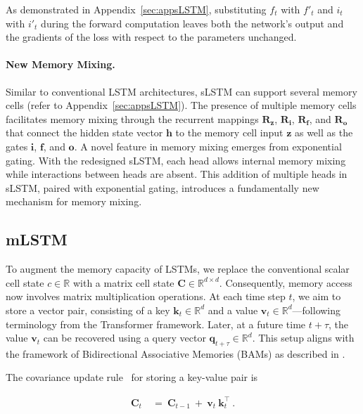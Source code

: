 As demonstrated in Appendix~\ref{sec:appsLSTM}, substituting $f_t$ with $f'_t$ and $i_t$ with $i'_t$ during the forward computation leaves both the network’s output and the gradients of the loss with respect to the parameters unchanged.

\paragraph{New Memory Mixing.} Similar to conventional LSTM architectures, sLSTM can support several memory cells (refer to Appendix~\ref{sec:appsLSTM}). The presence of multiple memory cells facilitates memory mixing through the recurrent mappings $\mathbf{R}_{\mathbf{z}}$, $\mathbf{R}_{\mathbf{i}}$, $\mathbf{R}_{\mathbf{f}}$, and $\mathbf{R}_{\mathbf{o}}$ that connect the hidden state vector $\mathbf{h}$ to the memory cell input $\mathbf{z}$ as well as the gates $\mathbf{i}$, $\mathbf{f}$, and $\mathbf{o}$. A novel feature in memory mixing emerges from exponential gating. With the redesigned sLSTM, each head allows internal memory mixing while interactions between heads are absent. This addition of multiple heads in sLSTM, paired with exponential gating, introduces a fundamentally new mechanism for memory mixing.

\subsection{mLSTM}
\label{sec:mLSTM}

To augment the memory capacity of LSTMs, we replace the conventional scalar cell state $c \in \mathbb{R}$ with a matrix cell state $\mathbf{C} \in \mathbb{R}^{d \times d}$. Consequently, memory access now involves matrix multiplication operations. At each time step $t$, we aim to store a vector pair, consisting of a key $\mathbf{k}_t \in \mathbb{R}^d$ and a value $\mathbf{v}_t \in \mathbb{R}^d$—following terminology from the Transformer framework. Later, at a future time $t + \tau$, the value $\mathbf{v}_t$ can be recovered using a query vector $\mathbf{q}_{t+\tau} \in \mathbb{R}^d$. This setup aligns with the framework of Bidirectional Associative Memories (BAMs) as described in \citep{Kohonen:72,Anderson:72,Nakano:72,Anderson:77}.

The covariance update rule~\citep{Sejnowski:77,Dayan:91} for storing a key-value pair is

\begin{align}
\mathbf{C}_t \ &= \ \mathbf{C}_{t-1} \ + \ \mathbf{v}_{t} \ \mathbf{k}_t^\top \ .
\end{align}

